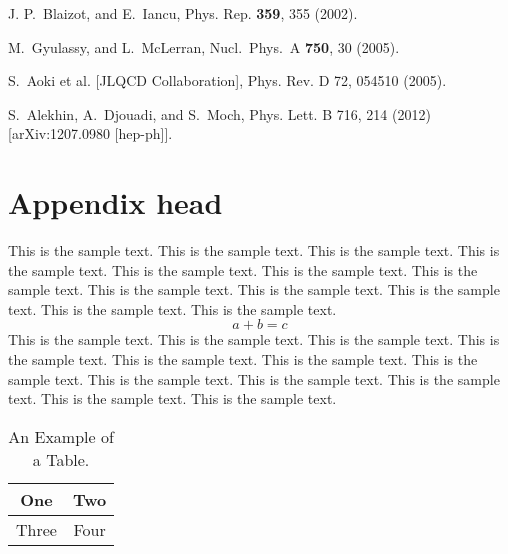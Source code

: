 \documentclass[preprint]{ptephy_v1}%
\begin{document}
\begin{thebibliography}{9}

J. P.~Blaizot, and E.~Iancu, Phys. Rep. {\bf 359}, 355 (2002).

M.~Gyulassy, and L.~McLerran, Nucl.\ Phys.\  A {\bf 750}, 30 (2005). \\ 

S.~Aoki et al. [JLQCD Collaboration], Phys. Rev. D 72, 054510 (2005). \\

S.~Alekhin, A.~Djouadi, and S.~Moch, Phys. Lett. B 716, 214 (2012) [arXiv:1207.0980 [hep-ph]]. 

\end{thebibliography}

\appendix

\section{Appendix head}

This is the sample text. This is the sample text. This is the sample text. This is the sample text.
This is the sample text. This is the sample text. This is the sample text. This is the sample text.
This is the sample text. This is the sample text. This is the sample text. This is the sample text.
\begin{equation}
a + b = c
\end{equation}
This is the sample text. This is the sample text. This is the sample text. This is the sample text.
This is the sample text. This is the sample text. This is the sample text. This is the sample text.
This is the sample text. This is the sample text. This is the sample text. This is the sample text.

\begin{table}[!h]
\caption{An Example of a Table.}%
\label{table_example}
\centering
\begin{tabular}{|c||c|}%
\hline
One & Two\\ %
\hline
Three & Four\\%
\hline
\end{tabular}
\end{table}%
\end{document}
